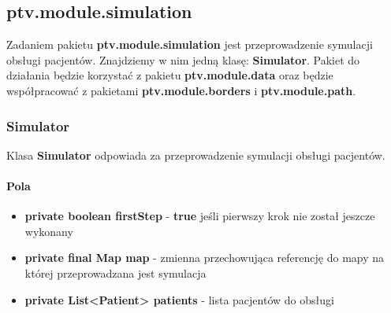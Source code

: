 \documentclass[]{article}
\begin{document}
        
        \subsection{ptv.module.simulation} %
            Zadaniem pakietu \textbf{ptv.module.simulation} jest przeprowadzenie symulacji obsługi pacjentów.
            Znajdziemy w nim jedną klasę: \textbf{Simulator}.
            Pakiet do działania będzie korzystać z pakietu \textbf{ptv.module.data} oraz
            będzie współpracować z pakietami \textbf{ptv.module.borders} i \textbf{ptv.module.path}.
            
            \subsubsection{Simulator}
                Klasa \textbf{Simulator} odpowiada za przeprowadzenie symulacji obsługi pacjentów.
                
                \paragraph{Pola}
                    \begin{itemize}
                        \item \textbf{private boolean firstStep} - \textbf{true} jeśli pierwszy krok nie został jeszcze wykonany
                        \item \textbf{private final Map map} - zmienna przechowująca referencję do mapy na której przeprowadzana jest symulacja
                        \item \textbf{private List<Patient> patients} - lista pacjentów do obsługi
                    \end{itemize}
                    
\end{document}
